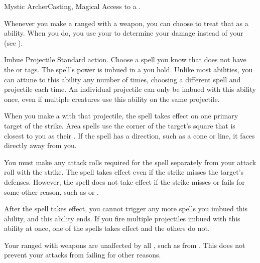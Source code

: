   \begin{magicalfeat}{Mystic Archer}{Casting, Magical}
    \featpre Access to a .

     Whenever you make a ranged  with a  weapon, you can choose to treat that as a \magical ability.
    When you do, you use your  to determine your damage instead of your  (see ).

    \begin{magicalattuneability}{Imbue Projectile}{}
      \abilityusagetime Standard action.
      \rankline
      Choose a spell you know that does not have the  or  tags.
      The spell's power is imbued in a  you hold.
      Unlike most  abilities, you can attune to this ability any number of times, choosing a different spell and projectile each time.
      An individual projectile can only be imbued with this ability once, even if multiple creatures use this ability on the same projectile.

      When you make a  with that projectile, the spell takes effect on one primary target of the strike.
      Area spells use the corner of the target's square that is closest to you as their .
      If the spell has a direction, such as a cone or line, it faces directly away from you.

      You must make any attack rolls required for the spell separately from your attack roll with the strike.
      The spell takes effect even if the strike misses the target's defenses.
      However, the spell does not take effect if the strike misses or fails for some other reason, such as  or .

      After the spell takes effect, you  cannot trigger any more spells you imbued this ability, and this ability ends.
      If you fire multiple projectiles imbued with this ability at once, one of the spells takes effect and the others do not.
    \end{magicalattuneability}

     Your ranged  with  weapons are unaffected by all , such as from .
    This does not prevent your attacks from failing for other reasons.


\end{magicalfeat}

